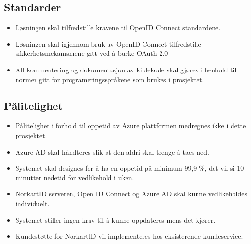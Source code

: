 \subsection{Standarder}
\label{subsec:kravspesifikasjonGammel_operasjonelleKrav_standarder}
\begin{itemize}
\item Løsningen skal tilfredstille kravene til OpenID Connect standardene.
\item Løsningen skal igjennom bruk av OpenID Connect tilfredstille sikkerhetsmekanismene gitt ved å burke OAuth 2.0
\item All kommentering og dokumentasjon av kildekode skal gjøres i henhold til normer gitt for programeringsspråkene som brukes i prosjektet.
\end{itemize}

\subsection{Pålitelighet}
\label{subsec:kravspesifikasjonGammel_operasjonelleKrav_pålitelighet}
\begin{itemize}
\item Pålitelighet i forhold til oppetid av Azure plattformen medregnes ikke i dette prosjektet. 
\item Azure AD skal håndteres slik at den aldri skal trenge å taes ned. 
\item Systemet skal designes for å ha en oppetid på minimum 99,9 \%, det vil si 10 minutter nedetid for vedlikehold i uken.
\item NorkartID serveren, Open ID Connect og Azure AD skal kunne vedlikeholdes individuelt.
\item Systemet stiller ingen krav til å kunne oppdateres mens det kjører.
\item Kundestøtte for NorkartID vil implementeres hos eksisterende kundeservice.
\end{itemize}

